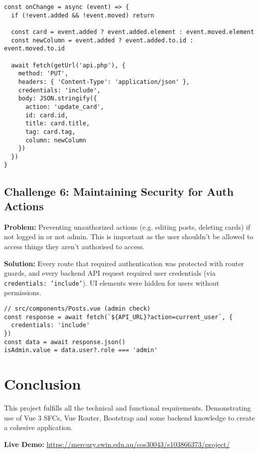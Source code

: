 \documentclass[11pt,a4paper]{article}
\begin{document}
\begin{verbatim}
const onChange = async (event) => {
  if (!event.added && !event.moved) return

  const card = event.added ? event.added.element : event.moved.element
  const newColumn = event.added ? event.added.to.id : event.moved.to.id

  await fetch(getUrl('api.php'), {
    method: 'PUT',
    headers: { 'Content-Type': 'application/json' },
    credentials: 'include',
    body: JSON.stringify({
      action: 'update_card',
      id: card.id,
      title: card.title,
      tag: card.tag,
      column: newColumn
    })
  })
}
\end{verbatim}

\subsection*{Challenge 6: Maintaining Security for Auth Actions}
\textbf{Problem:} Preventing unauthorized actions (e.g. editing posts, deleting cards) if not logged in or not admin. This is important as the user shouldn't be allowed to access things they aren't authorised to access.

\textbf{Solution:} Every route that required authentication was protected with router guards, and every backend API request required user credentials (via \texttt{credentials: 'include'}). UI elements were hidden for users without permissions.

\begin{verbatim}
// src/components/Posts.vue (admin check)
const response = await fetch(`${API_URL}?action=current_user`, {
  credentials: 'include'
})
const data = await response.json()
isAdmin.value = data.user?.role === 'admin'
\end{verbatim}

\section*{Conclusion}

\noindent
This project fulfills all the technical and functional requirements. Demonstrating use of Vue 3 SFCs, Vue Router, Bootstrap and some backend knowledge to create a cohesive application.

\bigskip
\noindent
\textbf{Live Demo:} \url{https://mercury.swin.edu.au/cos30043/s103866373/project/}
\end{document}
